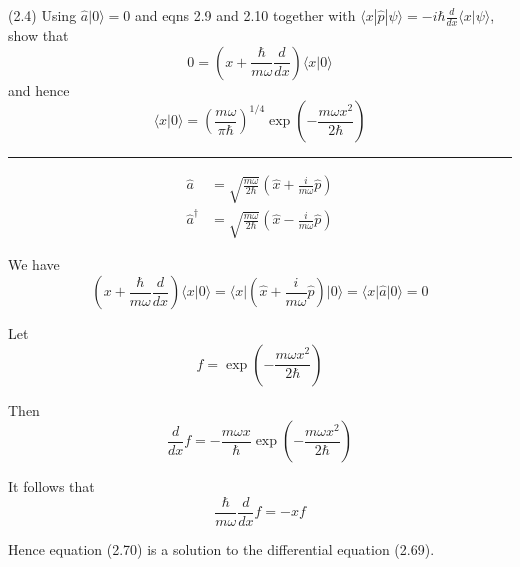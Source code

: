 \documentclass[12pt]{article}
\begin{document}
(2.4)
Using $\hat a|0\rangle=0$ and eqns 2.9 and 2.10 together with
$\langle x|\hat p|\psi\rangle=-i\hbar\frac{d}{dx}\langle x|\psi\rangle$, show that
\begin{equation*}
0=\left(x+\frac{\hbar}{m\omega}\frac{d}{dx}\right)
\langle x|0\rangle
\tag{2.69}
\end{equation*}
and hence
\begin{equation*}
\langle x|0\rangle=\left(\frac{m\omega}{\pi\hbar}\right)^{1/4}
\exp\left(-\frac{m\omega x^2}{2\hbar}\right)
\tag{2.70}
\end{equation*}

\bigskip
\hrule

\bigskip
\begin{align*}
\hat a&=\sqrt{\frac{m\omega}{2\hbar}}
\left(\hat x+\frac{i}{m\omega}\hat p\right)
\tag{2.9}
\\
\hat a^\dag&=\sqrt{\frac{m\omega}{2\hbar}}
\left(\hat x-\frac{i}{m\omega}\hat p\right)
\tag{2.10}
\end{align*}

We have
\begin{equation*}
\left(x+\frac{\hbar}{m\omega}\frac{d}{dx}\right)\langle x|0\rangle
=\langle x|\left(\hat x+\frac{i}{m\omega}\hat p\right)|0\rangle
=\langle x|\hat a|0\rangle
=0
\end{equation*}

Let
\begin{equation*}
f=\exp\left(-\frac{m\omega x^2}{2\hbar}\right)
\end{equation*}

Then
\begin{equation*}
\frac{d}{dx}f=-\frac{m\omega x}{\hbar}\exp\left(-\frac{m\omega x^2}{2\hbar}\right)
\end{equation*}

It follows that
\begin{equation*}
\frac{\hbar}{m\omega}\frac{d}{dx}f=-xf
\end{equation*}

Hence equation (2.70) is a solution to the differential equation (2.69).
\end{document}
